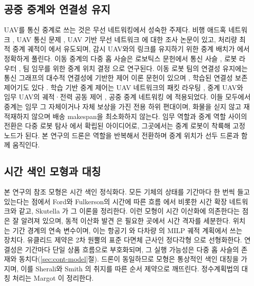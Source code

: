 \documentclass[final,5p,times,twocolumn]{elsarticle}
\begin{document}
\subsection{공중 중계와 연결성 유지}
\label{sec:rel-relay}
UAV를 통신 중계로 쓰는 것은 무선 네트워킹에서 성숙한 주제다. 비행 애드혹 네트워크
\cite{bekmezci2013}, UAV 통신 문제 \cite{gupta2016}, UAV 기반 무선 네트워크 \cite{mozaffari2019}에
대한 조사 논문이 있고, 처리량 최적 중계 궤적이 \cite{zeng2016}에서 유도되며, 감시 UAV와의 링크를
유지하기 위한 중계 배치가 \cite{burdakov2010}에서 정확하게 풀린다. 이동 중계의 다중 홉 사슬은
로보틱스 문헌에서 통신 사슬 \cite{dixon2009}, 로봇 라우터 \cite{tekdas2010}, 팀 임무를 위한 중계
위치 결정 \cite{yanmaz2022}으로 연구된다. 이동 로봇 팀의 연결성 유지에는 통신 그래프의 대수적
연결성에 기반한 제어 이론 문헌이 있으며 \cite{zavlanos2007,zavlanos2011}, 학습된 연결성 보존
제어기도 있다 \cite{li2021}. 학습 기반 중계 제어는 UAV 네트워크의 패킷 라우팅 \cite{ding2022},
중계 UAV와 임무 UAV의 궤적·전력 공동 제어 \cite{mutto2024}, 공중 중계 네트워킹 \cite{maen2024}에
적용되었다. 이들 모두에서 중계는 임무 그 자체이거나 자체 보상을 가진 전용 하위 편대이며, 화물을
싣지 않고 재적재하지 않으며 배송 makespan을 최소화하지 않는다. 임무 역할과 중계 역할 사이의
전환은 다중 로봇 탐사 \cite{dehoog2009,cesare2015}에서 확립된 아이디어로, 그곳에서는 중계 로봇이
착륙해 고정 노드가 된다. 본 연구의 드론은 역할을 반복해서 전환하며 중계 위치가 선두 드론과 함께
움직인다.

\subsection{시간 색인 모형과 대칭}
\label{sec:rel-tenet}
본 연구의 참조 모형은 시간 색인 정식화다. 모든 기체의 상태를 기간마다 한 번씩 들고 있는다는 점에서
Ford와 Fulkerson의 시간에 따른 흐름 \cite{ford1962}에서 비롯한 시간 확장 네트워크와 같고, Skutella
\cite{skutella2009}가 그 이론을 정리한다. 이런 모형이 시간 이산화에 의존한다는 점은 잘 알려져 있으며,
동적 이산화 발견 \cite{boland2017}은 필요한 곳에서 시간 격자를 세분한다. 위치는 기간 경계의 연속
변수이며, 이는 항공기 \cite{richards2002}와 다차량 \cite{schouwenaars2001}의 MILP 궤적 계획에서 쓰는
장치다. 유클리드 제약은 2차 원뿔의 표준 다면체 근사인 정다각형 \cite{bental2001}으로 선형화한다.
연결성은 기간마다 단일 상품 흐름으로 부호화되며, 그 실행 가능성은 다중 홉 사슬의 존재와
동치다(\ref{sec:cont-model}절). 드론이 동일하므로 모형은 통상적인 색인 대칭을 가지며, 이를 Sherali와
Smith \cite{sherali2001}의 취지를 따른 순서 제약으로 깨뜨린다. 정수계획법의 대칭 처리는 Margot
\cite{margot2010}이 정리한다.
\end{document}
